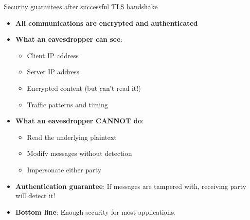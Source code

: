 \documentclass[aspectratio=169, lualatex, handout]{beamer}
\begin{document}
\begin{frame}{Security guarantees after successful TLS handshake}
	\begin{itemize}[<+->]
		\item \textbf{All communications are encrypted and authenticated}
		\item \textbf{What an eavesdropper can see}:
		      \begin{itemize}
			      \item Client IP address
			      \item Server IP address
			      \item Encrypted content (but can't read it!)
			      \item Traffic patterns and timing
		      \end{itemize}
		\item \textbf{What an eavesdropper CANNOT do}:
		      \begin{itemize}
			      \item Read the underlying plaintext
			      \item Modify messages without detection
			      \item Impersonate either party
		      \end{itemize}
		\item \textbf{Authentication guarantee}: If messages are tampered with, receiving party will detect it!
		\item \textbf{Bottom line}: Enough security for most applications.
	\end{itemize}
\end{frame}
\end{document}
